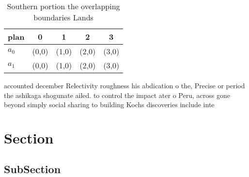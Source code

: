 \documentclass[a4paper]{article}
\begin{document}
\begin{table}
\begin{adjustbox}{width=0.6\columnwidth}
\begin{tabular}{|l|l|l|l|l|}
\hline
\textbf{plan} & \multicolumn{1}{c|}{\textbf{0}} & \multicolumn{1}{c|}{\textbf{1}} & \multicolumn{1}{c|}{\textbf{2}} & \multicolumn{1}{c|}{\textbf{3}} \\ \hline
\textbf{$a_0$}  & (0,0) & (1,0) & (2,0) & (3,0) \\ \hline
\textbf{$a_1$}  & (0,0) & (1,0) & (2,0) & (3,0) \\ \hline
\end{tabular}
\end{adjustbox}
\caption{Southern portion the overlapping boundaries Lands
}
\end{table}

accounted december Relectivity roughness his abdication o the, Precise or period the ashikaga shogunate ailed. to control the impact ater o Peru, across gone beyond simply social sharing to building Kochs discoveries include inte

\section{Section}

\subsection{SubSection}
\end{document}
